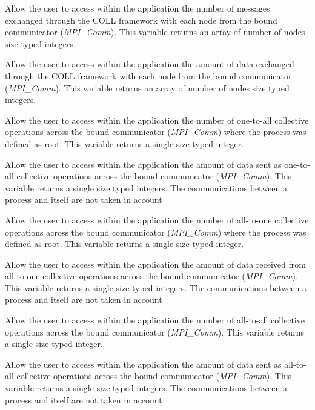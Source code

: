 \documentclass[notitlepage]{article}
\newcommand{\brkunds}[0]{\allowbreak\_}
\begin{document}
\begin{description}
  [\textit{coll\brkunds{}monitoring\brkunds{}messages\brkunds{}count}]
  Allow the user to access within the application the number of
  messages exchanged through the COLL framework with each node from
  the bound communicator (\textit{MPI\brkunds{}Comm}). This variable
  returns an array of number of nodes size typed integers.
\item
  [\textit{coll\brkunds{}monitoring\brkunds{}messages\brkunds{}size}]
  Allow the user to access within the application the amount of data
  exchanged through the COLL framework with each node from the bound
  communicator (\textit{MPI\brkunds{}Comm}). This variable returns an
  array of number of nodes size typed integers.
\item [\textit{coll\brkunds{}monitoring\brkunds{}o2a\brkunds{}count}]
  Allow the user to access within the application the number of
  one-to-all collective operations across the bound communicator
  (\textit{MPI\brkunds{}Comm}) where the process was defined as
  root. This variable returns a single size typed integer.
\item [\textit{coll\brkunds{}monitoring\brkunds{}o2a\brkunds{}size}]
  Allow the user to access within the application the amount of data
  sent as one-to-all collective operations across the bound
  communicator (\textit{MPI\brkunds{}Comm}). This variable returns a
  single size typed integers. The communications between a process
  and itself are not taken in account
\item [\textit{coll\brkunds{}monitoring\brkunds{}a2o\brkunds{}count}]
  Allow the user to access within the application the number of
  all-to-one collective operations across the bound communicator
  (\textit{MPI\brkunds{}Comm}) where the process was defined as
  root. This variable returns a single size typed integer.
\item [\textit{coll\brkunds{}monitoring\brkunds{}a2o\brkunds{}size}]
  Allow the user to access within the application the amount of data
  received from all-to-one collective operations across the bound
  communicator (\textit{MPI\brkunds{}Comm}). This variable returns a
  single size typed integers. The communications between a process
  and itself are not taken in account
\item [\textit{coll\brkunds{}monitoring\brkunds{}a2a\brkunds{}count}]
  Allow the user to access within the application the number of
  all-to-all collective operations across the bound communicator
  (\textit{MPI\brkunds{}Comm}). This variable returns a single
  size typed integer.
\item [\textit{coll\brkunds{}monitoring\brkunds{}a2a\brkunds{}size}]
  Allow the user to access within the application the amount of data
  sent as all-to-all collective operations across the bound
  communicator (\textit{MPI\brkunds{}Comm}). This variable returns a
  single size typed integers. The communications between a process
  and itself are not taken in account
\end{description}
\end{document}
